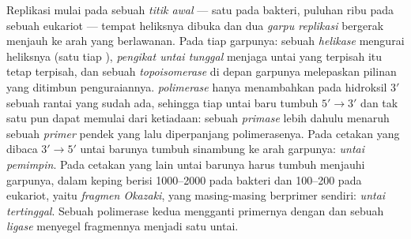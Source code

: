 \begin{definition}\label{def:b1:replication-mitosis:fork}
Replikasi mulai pada sebuah \emph{titik awal} --- satu pada 
bakteri, puluhan ribu pada sebuah  eukariot --- tempat heliksnya
dibuka dan dua \emph{garpu replikasi} bergerak menjauh ke arah yang
berlawanan. Pada tiap garpunya: sebuah \emph{helikase} mengurai
heliksnya (satu  tiap ), \emph{ pengikat untai
tunggal} menjaga untai yang terpisah itu tetap terpisah, dan sebuah
\emph{topoisomerase} di depan garpunya melepaskan pilinan yang ditimbun
penguraiannya. \emph{ polimerase} hanya menambahkan  pada
hidroksil $3'$ sebuah rantai yang sudah ada, sehingga tiap untai baru
tumbuh $5' \to 3'$ dan tak satu pun dapat memulai dari ketiadaan: sebuah
\emph{primase} lebih dahulu menaruh sebuah \emph{primer}  pendek yang
lalu diperpanjang polimerasenya. Pada cetakan yang dibaca $3' \to 5'$
untai barunya tumbuh sinambung ke arah garpunya: \emph{untai pemimpin}.
Pada cetakan yang lain untai barunya harus tumbuh menjauhi garpunya,
dalam keping berisi \qtyrange{1000}{2000}{}  pada bakteri dan
\qtyrange{100}{200}{} pada eukariot, yaitu \emph{fragmen Okazaki}, yang
masing-masing berprimer sendiri: \emph{untai tertinggal}. Sebuah
polimerase kedua mengganti primernya dengan  dan sebuah \emph{ligase}
menyegel fragmennya menjadi satu untai.
\end{definition}

